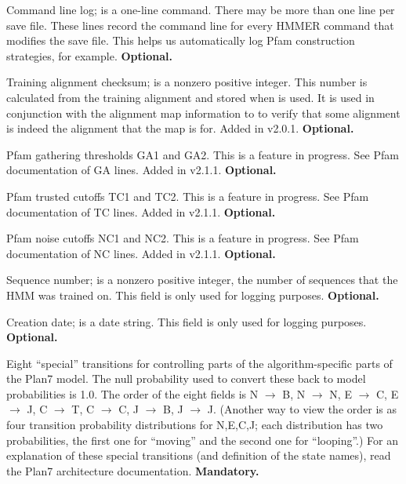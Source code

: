 \begin{wideitem}
\item [\emprog{COM   <s>}] Command line log;  is a one-line
command. There may be more than one  line per save
file. These lines record the command line for every HMMER command that
modifies the save file. This helps us automatically log Pfam
construction strategies, for example. \textbf{Optional.}

\item [\emprog{CKSUM  <d>}] Training alignment checksum;  is a nonzero
positive integer. This number is calculated from the training
alignment and stored when  is used. It is used in
conjunction with the alignment map information to to verify that some
alignment is indeed the alignment that the map is for.  Added in
v2.0.1. \textbf{Optional.}

\item [\emprog{GA    <f> <f>}] Pfam gathering thresholds GA1 and GA2.
This is a feature in progress. See Pfam documentation of GA lines.
Added in v2.1.1. \textbf{Optional.}

\item [\emprog{TC    <f> <f>}] Pfam trusted cutoffs TC1 and TC2.
This is a feature in progress. See Pfam documentation of TC lines.
Added in v2.1.1. \textbf{Optional.}

\item [\emprog{NC    <f> <f>}] Pfam noise cutoffs NC1 and NC2.
This is a feature in progress. See Pfam documentation of NC lines.
Added in v2.1.1. \textbf{Optional.}

\item [\emprog{NSEQ  <d>}] Sequence number;  is a nonzero
positive integer, the number of sequences that the HMM was trained on.
This field is only used for logging purposes.
\textbf{Optional.}

\item [\emprog{DATE  <s>}] Creation date;  is a date string.
This field is only used for logging purposes.
\textbf{Optional.}

\item [\emprog{XT    <d>*8}] Eight ``special'' transitions for
controlling parts of the algorithm-specific parts of the Plan7 model.
The null probability used to convert these back to model probabilities
is 1.0. The order of the eight fields is N $\rightarrow$ B, N
$\rightarrow$ N, E $\rightarrow$ C, E $\rightarrow$ J, C $\rightarrow$
T, C $\rightarrow$ C, J $\rightarrow$ B, J $\rightarrow$ J.  (Another
way to view the order is as four transition probability distributions
for N,E,C,J; each distribution has two probabilities, the first one
for ``moving'' and the second one for ``looping''.) For an explanation
of these special transitions (and definition of the state names), read
the Plan7 architecture documentation.
\textbf{Mandatory.}


\end{wideitem}
